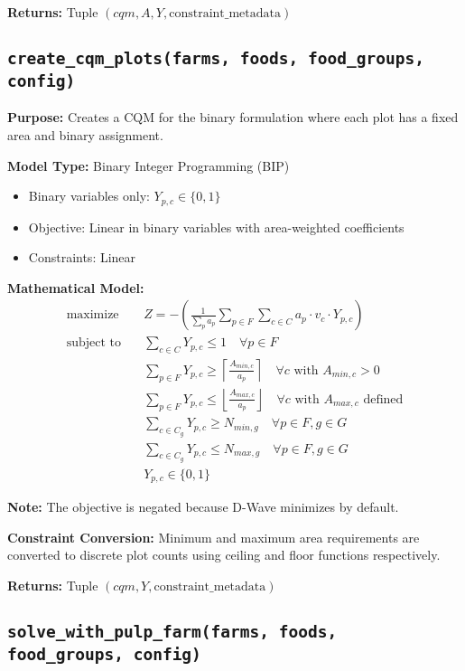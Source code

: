 \documentclass{article}
\begin{document}
\textbf{Returns:} Tuple $(cqm, A, Y, \text{constraint\_metadata})$

\subsection{\texttt{create\_cqm\_plots(farms, foods, food\_groups, config)}}

\textbf{Purpose:} Creates a CQM for the binary formulation where each plot has a fixed area and binary assignment.

\textbf{Model Type:} Binary Integer Programming (BIP)
\begin{itemize}
    \item Binary variables only: $Y_{p,c} \in \{0,1\}$
    \item Objective: Linear in binary variables with area-weighted coefficients
    \item Constraints: Linear
\end{itemize}

\textbf{Mathematical Model:}
\begin{align*}
\text{maximize} \quad & Z = -\left(\frac{1}{\sum_{p} a_p} \sum_{p \in F} \sum_{c \in C} a_p \cdot v_c \cdot Y_{p,c}\right) \\
\text{subject to} \quad & \sum_{c \in C} Y_{p,c} \leq 1 \quad \forall p \in F \\
& \sum_{p \in F} Y_{p,c} \geq \left\lceil \frac{A_{min,c}}{a_p} \right\rceil \quad \forall c \text{ with } A_{min,c} > 0 \\
& \sum_{p \in F} Y_{p,c} \leq \left\lfloor \frac{A_{max,c}}{a_p} \right\rfloor \quad \forall c \text{ with } A_{max,c} \text{ defined} \\
& \sum_{c \in C_g} Y_{p,c} \geq N_{min,g} \quad \forall p \in F, g \in G \\
& \sum_{c \in C_g} Y_{p,c} \leq N_{max,g} \quad \forall p \in F, g \in G \\
& Y_{p,c} \in \{0,1\}
\end{align*}

\textbf{Note:} The objective is negated because D-Wave minimizes by default.

\textbf{Constraint Conversion:} Minimum and maximum area requirements are converted to discrete plot counts using ceiling and floor functions respectively.

\textbf{Returns:} Tuple $(cqm, Y, \text{constraint\_metadata})$

\subsection{\texttt{solve\_with\_pulp\_farm(farms, foods, food\_groups, config)}}
\end{document}
